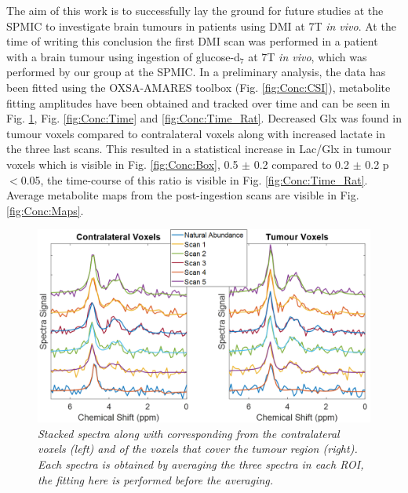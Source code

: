The aim of this work is to successfully lay the ground for future studies at the SPMIC to investigate brain tumours in patients using \ac{DMI} at 7T \textit{in vivo}. At the time of writing this conclusion the first DMI scan was performed in a patient with a brain tumour using ingestion of glucose-d$_7$ at 7T \textit{in vivo}, which was performed by our group at the SPMIC. In a preliminary analysis, the data has been fitted using the OXSA-AMARES toolbox \cite{Purvis2017OXSA:MATLAB} (Fig. \ref{fig:Conc:CSI}), metabolite fitting amplitudes have been obtained and tracked over time and can be seen in Fig. \ref{fig:Conc:stack}, Fig. \ref{fig:Conc:Time} and \ref{fig:Conc:Time_Rat}. Decreased Glx was found in tumour voxels compared to contralateral voxels along with increased lactate in the three last scans. This resulted in a statistical increase in Lac/Glx in tumour voxels which is visible in Fig. \ref{fig:Conc:Box}, 0.5 $\pm$ 0.2 compared to 0.2 $\pm$ 0.2 p$<$0.05, the time-course of this ratio is visible in Fig. \ref{fig:Conc:Time_Rat}. Average metabolite maps from the post-ingestion scans are visible in Fig. \ref{fig:Conc:Maps}.

\begin{figure}[H]
    \centering
    \includegraphics[width=1\linewidth]{Figures/Conclusion/Stacked.png}
    \caption{\textit{Stacked spectra along with corresponding from the contralateral voxels (left) and of the voxels that cover the tumour region (right). Each spectra is obtained by averaging the three spectra in each ROI, the fitting here is performed before the averaging.}}
    \label{fig:Conc:stack}
\end{figure}

